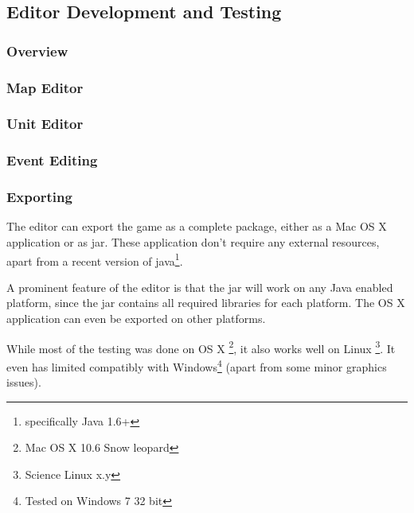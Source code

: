 \subsection{Editor Development and Testing}

\subsubsection{Overview}
\label{ssub:overview}

\subsubsection{Map Editor}
\label{ssub:map_editor}

\subsubsection{Unit Editor}
\label{ssub:unit_editors}

\subsubsection{Event Editing}

\subsubsection{Exporting}
\label{ssub:exporting}

The editor can export the game as a complete package, either as a Mac OS X application or as jar. These application don't require any external resources, apart from a recent version of java\footnote{specifically Java 1.6+}.

A prominent feature of the editor is that the jar will work on any Java enabled platform, since the jar contains all required libraries for each platform. The OS X application can even be exported on other platforms.

While most of the testing was done on OS X \footnote{Mac OS X 10.6 Snow leopard}, it also works well on Linux \footnote{Science  Linux x.y}. It even has limited compatibly with Windows\footnote{Tested on Windows 7 32 bit} (apart from some minor graphics issues).
